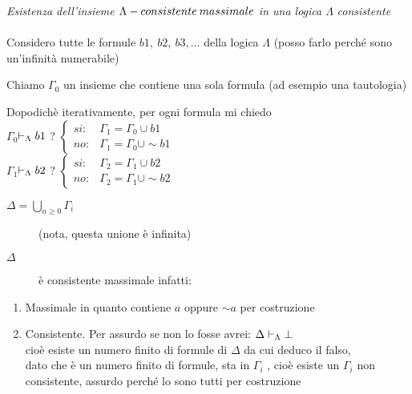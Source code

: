 \emph{\large{Esistenza dell'insieme $\Lambda-consistente\: massimale$}} \emph{\large{in
una logica $\Lambda$}} \emph{\large{consistente}}\\
\\
Considero tutte le formule $b1,\ b2,\ b3,\dots$ della logica $\Lambda$
(posso farlo perché sono un'infinità numerabile)

Chiamo $\Gamma_{0}$ un insieme che contiene una sola formula (ad
esempio una tautologia)

Dopodichè iterativamente, per ogni formula mi chiedo\\


$\Gamma_{0}$$\vdash_{\Lambda}b1$ ? $\begin{cases}
si: & \Gamma_{1}=\Gamma_{0}\cup b1\\
no: & \Gamma_{1}=\Gamma_{0}\cup\sim b1
\end{cases}$\\


$\Gamma_{1}$$\vdash_{\Lambda}b2$ ? $\begin{cases}
si: & \Gamma_{2}=\Gamma_{1}\cup b2\\
no: & \Gamma_{2}=\Gamma_{1}\cup\sim b2
\end{cases}$
\begin{description}
\item [{$\Delta=\bigcup_{n\geq0}\Gamma_{i}$}] (nota, questa unione è infinita)
\item [{$\Delta$}] è consistente massimale infatti:\end{description}
\begin{enumerate}
\item Massimale in quanto contiene $a$ oppure $\sim a$ per costruzione
\item Consistente. Per assurdo se non lo fosse avrei: $\Delta\vdash_{\Lambda}\bot$\\
cioè esiste un numero finito di formule di $\Delta$ da cui deduco
il falso,\\
dato che è un numero finito di formule, sta in $\Gamma_{i}$ , cioè
esiste un $\Gamma_{i}$ non consistente, assurdo perché lo sono tutti
per costruzione \lightning \end{enumerate}

